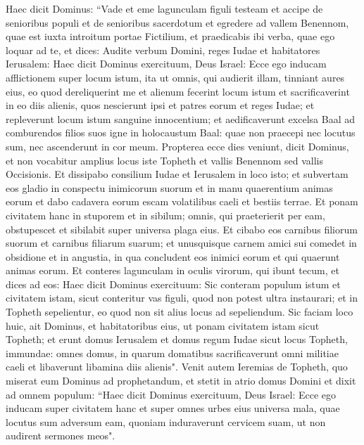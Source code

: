 \begin{biblechapter}  
\verse Haec dicit Dominus: “Vade et eme lagunculam figuli testeam et accipe de senioribus populi et de senioribus sacerdotum 
\verse et egredere ad vallem Benennom, quae est iuxta introitum portae Fictilium, et praedicabis ibi verba, quae ego loquar ad te, 
\verse et dices: Audite verbum Domini, reges Iudae et habitatores Ierusalem: Haec dicit Dominus exercituum, Deus Israel: Ecce ego inducam afflictionem super locum istum, ita ut omnis, qui audierit illam, tinniant aures eius, 
\verse eo quod dereliquerint me et alienum fecerint locum istum et sacrificaverint in eo diis alienis, quos nescierunt ipsi et patres eorum et reges Iudae; et repleverunt locum istum sanguine innocentium; 
\verse et aedificaverunt excelsa Baal ad comburendos filios suos igne in holocaustum Baal: quae non praecepi nec locutus sum, nec ascenderunt in cor meum. 
\verse Propterea ecce dies veniunt, dicit Dominus, et non vocabitur amplius locus iste Topheth et vallis Benennom sed vallis Occisionis. 
\verse Et dissipabo consilium Iudae et Ierusalem in loco isto; et subvertam eos gladio in conspectu inimicorum suorum et in manu quaerentium animas eorum et dabo cadavera eorum escam volatilibus caeli et bestiis terrae. 
\verse Et ponam civitatem hanc in stuporem et in sibilum; omnis, qui praeterierit per eam, obstupescet et sibilabit super universa plaga eius. 
\verse Et cibabo eos carnibus filiorum suorum et carnibus filiarum suarum; et unusquisque carnem amici sui comedet in obsidione et in angustia, in qua concludent eos inimici eorum et qui quaerunt animas eorum. 
\verse Et conteres lagunculam in oculis virorum, qui ibunt tecum, 
\verse et dices ad eos: Haec dicit Dominus exercituum: Sic conteram populum istum et civitatem istam, sicut conteritur vas figuli, quod non potest ultra instaurari; et in Topheth sepelientur, eo quod non sit alius locus ad sepeliendum. 
\verse Sic faciam loco huic, ait Dominus, et habitatoribus eius, ut ponam civitatem istam sicut Topheth; 
\verse et erunt domus Ierusalem et domus regum Iudae sicut locus Topheth, immundae: omnes domus, in quarum domatibus sacrificaverunt omni militiae caeli et libaverunt libamina diis alienis". 
\verse Venit autem Ieremias de Topheth, quo miserat eum Dominus ad prophetandum, et stetit in atrio domus Domini et dixit ad omnem populum: 
\verse “Haec dicit Dominus exercituum, Deus Israel: Ecce ego inducam super civitatem hanc et super omnes urbes eius universa mala, quae locutus sum adversum eam, quoniam induraverunt cervicem suam, ut non audirent sermones meos". 
\end{biblechapter}


